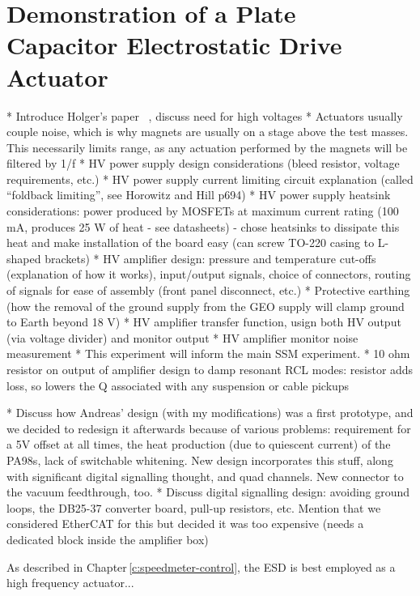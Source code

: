 \chapter{Demonstration of a Plate Capacitor Electrostatic Drive Actuator}
\label{c:esd-concept}

* Introduce Holger's paper~\cite{Wittel2015} \etal{}, discuss need for high voltages
* Actuators usually couple noise, which is why magnets are usually on a stage above the test masses. This necessarily limits range, as any actuation performed by the magnets will be filtered by 1/f
* HV power supply design considerations (bleed resistor, voltage requirements, etc.)
* HV power supply current limiting circuit explanation (called ``foldback limiting'', see Horowitz and Hill p694)
* HV power supply heatsink considerations: power produced by MOSFETs at maximum current rating (100 mA, produces 25 W of heat - see datasheets) - chose heatsinks to dissipate this heat and make installation of the board easy (can screw TO-220 casing to L-shaped brackets)
* HV amplifier design: pressure and temperature cut-offs (explanation of how it works), input/output signals, choice of connectors, routing of signals for ease of assembly (front panel disconnect, etc.)
* Protective earthing (how the removal of the ground supply from the GEO supply will clamp ground to Earth beyond 18 V)
* HV amplifier transfer function, usign both HV output (via voltage divider) and monitor output
* HV amplifier monitor noise measurement
* This experiment will inform the main SSM experiment.
* 10 ohm resistor on output of amplifier design to damp resonant RCL modes: resistor adds loss, so lowers the Q associated with any suspension or cable pickups

* Discuss how Andreas' design (with my modifications) was a first prototype, and we decided to redesign it afterwards because of various problems: requirement for a 5V offset at all times, the heat production (due to quiescent current) of the PA98s, lack of switchable whitening. New design incorporates this stuff, along with significant digital signalling thought, and quad channels. New connector to the vacuum feedthrough, too.
* Discuss digital signalling design: avoiding ground loops, the DB25-37 converter board, pull-up resistors, etc. Mention that we considered EtherCAT for this but decided it was too expensive (needs a dedicated block inside the amplifier box)

As described in Chapter\,\ref{c:speedmeter-control}, the \gls{ESD} is best employed as a high frequency actuator...

